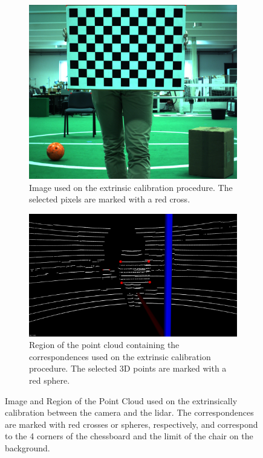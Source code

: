\begin{figure}[H]
	\centering
	\begin{subfigure}[c]{0.39\textwidth}
		\includegraphics[width=\textwidth]{img/calibration/camera-extrinsic-calibration-points.jpg}
		\caption{Image used on the extrinsic calibration procedure. The selected pixels are marked with a red cross.}
		\label{fig:extrinsic-calibration-correspondences:camera}
	\end{subfigure}
	\qquad
	\begin{subfigure}[c]{0.55\textwidth}
		\includegraphics[width=\textwidth]{img/calibration/lidar-extrinsic-calibration-points.png}
		\caption{Region of the point cloud containing the correspondences used on the extrinsic calibration procedure. The selected 3D points are marked with a red sphere.}
		\label{fig:extrinsic-calibration-correspondences:lidar}
	\end{subfigure}
	\caption{Image and Region of the Point Cloud used on the extrinsically calibration between the camera and the \ac{lidar}. The correspondences are marked with red crosses or spheres, respectively, and correspond to the 4 corners of the chessboard and the limit of the chair on the background.}
	\label{fig:calibration-correspondences}
\end{figure}

